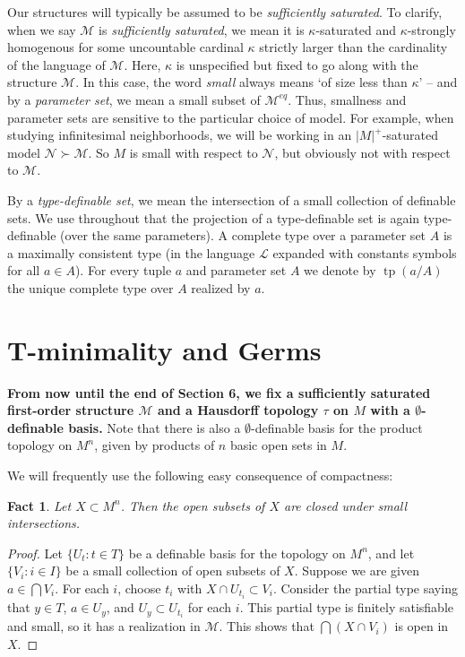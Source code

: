 \documentclass{amsart}
\newtheorem{fact}[theorem]{Fact}
\theoremstyle{definition}
\newcommand{\tp}{\operatorname{tp}}
\begin{document}
Our structures will typically be assumed to be \emph{sufficiently saturated}. To clarify, when we say $\mathcal M$ is \textit{sufficiently saturated}, we mean it is $\kappa$-saturated and $\kappa$-strongly homogenous for some uncountable cardinal $\kappa$ strictly larger than the cardinality of the language of $\mathcal M$. Here, $\kappa$ is unspecified but fixed to go along with the structure $\mathcal M$. In this case, the word \textit{small} always means `of size less than $\kappa$' -- and by a \textit{parameter set}, we mean a small subset of $\mathcal M^{eq}$. Thus, smallness and parameter sets are sensitive to the particular choice of model. For example, when studying infinitesimal neighborhoods, we will be working in an $|M|^+$-saturated model $\mathcal N\succ \mathcal M$. So $M$ is small with respect to $\mathcal N$, but obviously not with respect to $\mathcal M$. 

By a \textit{type-definable set}, we mean the intersection of a small collection of definable sets. We use throughout that the projection of a type-definable set is again type-definable (over the same parameters). A complete type over a parameter set $A$ is a maximally consistent type (in the language $\mathcal L$ expanded with constants symbols for all $a\in A$). For every tuple $a$ and parameter set $A$ we denote by $\tp(a/A)$ the unique complete type over $A$ realized by $a$. \\


\section{T-minimality and Germs}

\textbf{From now until the end of Section 6, we fix a sufficiently saturated first-order structure $\mathcal M$ and a Hausdorff topology $\tau$ on $M$ with a $\emptyset$-definable basis.} Note that there is also a $\emptyset$-definable basis for the product topology on $M^n$, given by products of $n$ basic open sets in $M$.

We will frequently use the following easy consequence of compactness:

\begin{fact}\label{F: int of opens} Let $X\subset M^n$. Then the open subsets of $X$ are closed under small intersections.
\end{fact}
\begin{proof}
    Let $\{U_t:t\in T\}$ be a definable basis for the topology on $M^n$, and let $\{V_i:i\in I\}$ be a small collection of open subsets of $X$. Suppose we are given $a\in\bigcap V_i$. For each $i$, choose $t_i$ with $X\cap U_{t_i}\subset V_i$. Consider the partial type saying that $y\in T$, $a\in U_y$, and $U_y\subset U_{t_i}$ for each $i$. This partial type is finitely satisfiable and small, so it has a realization in $\mathcal M$. This shows that $\bigcap (X\cap V_i)$ is open in $X$.
\end{proof}
\end{document}
